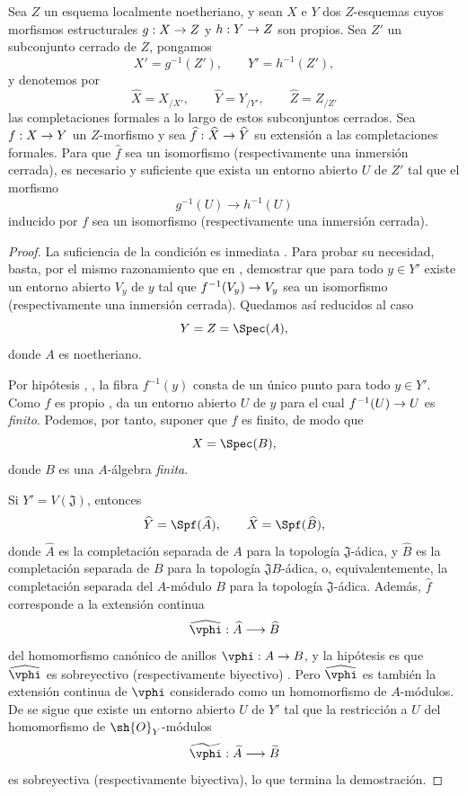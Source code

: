 \documentclass[oneside]{amsart}
\makeatletter
\newcommand{\ega@arrow}[2]{\mathchoice{#1}{#2}{#2}{#2}}
\renewcommand{\to}{\ega@arrow{\longrightarrow}{\rightarrow}}
\let\EGAOriginalLabel\label
\renewcommand{\label}[1]{\phantomsection\EGAOriginalLabel{#1}}
\makeatother
\begin{document}
\begin{proposition}[4.6.8]
\label{III.4.6.8}
Sea $Z$ un esquema localmente noetheriano, y sean $X$ e $Y$
dos $Z$-esquemas cuyos morfismos estructurales
$g:X\to Z$ y $h:Y\to Z$ son propios. Sea $Z'$ un subconjunto cerrado
de $Z$, pongamos
\[
  X'=g^{-1}(Z'),\qquad Y'=h^{-1}(Z'),
\]
y denotemos por
\[
  \widehat X=X_{/X'},\qquad
  \widehat Y=Y_{/Y'},\qquad
  \widehat Z=Z_{/Z'}
\]
las completaciones formales a lo largo de estos subconjuntos cerrados. Sea $f:X\to Y$
un $Z$-morfismo y sea
$\widehat f:\widehat X\to\widehat Y$ su extensión a las completaciones
formales. Para que $\widehat f$ sea un isomorfismo
(\textup{respectivamente} una inmersión cerrada), es necesario y suficiente
que exista un entorno abierto $U$ de $Z'$ tal que el
morfismo
\[
  g^{-1}(U)\longrightarrow h^{-1}(U)
\]
inducido por $f$ sea un isomorfismo (\textup{respectivamente} una inmersión cerrada).
\end{proposition}

\begin{proof}
La suficiencia de la condición es inmediata
. Para probar su necesidad, basta, por el
mismo razonamiento que en , demostrar que para todo
$y\in Y'$ existe un entorno abierto $V_y$ de $y$ tal que
$f^{-1}(V_y)\to V_y$ sea un isomorfismo (respectivamente una
inmersión cerrada). Quedamos así reducidos al caso
\[
  Y=Z=\Spec(A),
\]
donde $A$ es noetheriano.

Por hipótesis , , la fibra
$f^{-1}(y)$ consta de un único punto para todo $y\in Y'$. Como
$f$ es propio ,  da un entorno
abierto $U$ de $y$ para el cual $f^{-1}(U)\to U$ es \emph{finito}. Podemos,
por tanto, suponer que $f$ es finito, de modo que
\[
  X=\Spec(B),
\]
donde $B$ es una $A$-álgebra \emph{finita}.

Si $Y'=V(\mathfrak J)$, entonces
\[
  \widehat Y=\Spf(\widehat A),
  \qquad
  \widehat X=\Spf(\widehat B),
\]
donde $\widehat A$ es la completación separada de $A$ para la
topología $\mathfrak J$-ádica, y $\widehat B$ es la completación
separada de $B$ para la topología $\mathfrak JB$-ádica, o,
equivalentemente, la completación separada del $A$-módulo $B$ para
la topología $\mathfrak J$-ádica. Además, $\widehat f$
corresponde a la extensión continua
\[
  \widehat{\vphi}:\widehat A\longrightarrow\widehat B
\]
del homomorfismo canónico de anillos $\vphi:A\to B$, y la
hipótesis es que $\widehat{\vphi}$ es sobreyectivo (respectivamente
biyectivo) . Pero $\widehat{\vphi}$ es también la
extensión continua de $\vphi$ considerado como un homomorfismo de
$A$-módulos. De  se sigue que existe un
entorno abierto $U$ de $Y'$ tal que la restricción a $U$ del
homomorfismo de $\sh{O}_Y$-módulos
\[
  \widetilde{\vphi}:\widetilde A\longrightarrow\widetilde B
\]
es sobreyectiva (respectivamente biyectiva), lo que termina la demostración.
\end{proof}
\end{document}
